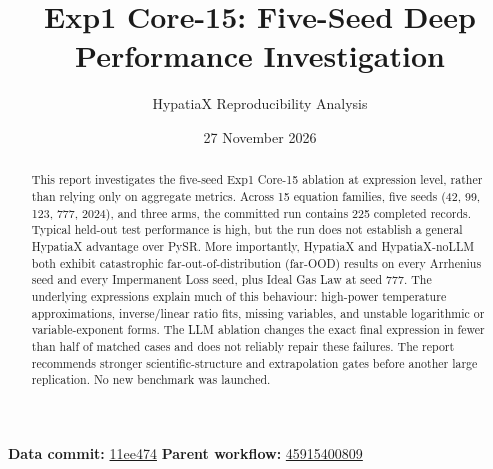 \documentclass[11pt,a4paper]{article}
\title{Exp1 Core-15: Five-Seed Deep Performance Investigation}
\author{HypatiaX Reproducibility Analysis}
\date{27 November 2026}
\begin{document}
\maketitle

\begin{center}
\small
\textbf{Data commit:} \href{https://github.com/sednabcn/LLM-HypatiaX-REPRO/commit/11ee474}{11ee474}
\quad
\textbf{Parent workflow:} \href{https://github.com/sednabcn/LLM-HypatiaX-REPRO/actions/runs/45915400809}{45915400809}
\end{center}

\begin{abstract}
This report investigates the five-seed Exp1 Core-15 ablation at expression level, rather than relying only on aggregate metrics. Across 15 equation families, five seeds (42, 99, 123, 777, 2024), and three arms, the committed run contains 225 completed records. Typical held-out test performance is high, but the run does not establish a general HypatiaX advantage over PySR. More importantly, HypatiaX and HypatiaX-noLLM both exhibit catastrophic far-out-of-distribution (far-OOD) results on every Arrhenius seed and every Impermanent Loss seed, plus Ideal Gas Law at seed 777. The underlying expressions explain much of this behaviour: high-power temperature approximations, inverse/linear ratio fits, missing variables, and unstable logarithmic or variable-exponent forms. The LLM ablation changes the exact final expression in fewer than half of matched cases and does not reliably repair these failures. The report recommends stronger scientific-structure and extrapolation gates before another large replication. No new benchmark was launched.
\end{abstract}
\end{document}

